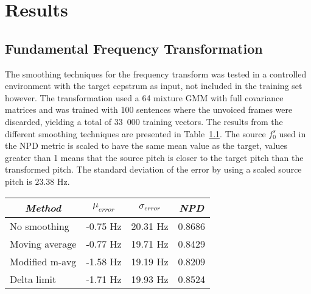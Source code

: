 \chapter{Results} %
\label{cha:results}

% 
% 
% 
% 
% 


\section{Fundamental Frequency Transformation} %
\label{sec:fundamental_frequency_ransformation}
The smoothing techniques for the frequency transform was tested in a controlled environment with the target cepstrum as input, not included in the training set however. The transformation used a 64 mixture GMM with full covariance matrices and was trained with 100 sentences where the unvoiced frames were discarded, yielding a total of 33~000 training vectors. The results from the different smoothing techniques are presented in Table~\ref{tab:pitch_pred_target_input}. The source $f_0^s$ used in the NPD metric is scaled to have the same mean value as the target, values greater than 1 means that the source pitch is closer to the target pitch than the transformed pitch. The standard deviation of the error by using a scaled source pitch is $23.38$ Hz.
\begin{table}[htbp]
	\begin{center}
		\label{tab:pitch_pred_target_input}	
		\begin{tabular}{lrrr}
			\toprule
			\multicolumn{1}{c}{\emph{Method}} & \multicolumn{1}{c}{$\mu_{error}$} & \multicolumn{1}{c}{$\sigma_{error}$} & \multicolumn{1}{c}{\emph{NPD}} \\
			\midrule
			No smoothing & -0.75 Hz & 20.31 Hz & 0.8686\\
			Moving average & -0.77 Hz & 19.71 Hz & 0.8429 \\
			Modified m-avg & -1.58 Hz & 19.19 Hz & 0.8209 \\
			Delta limit & -1.71 Hz & 19.93 Hz & 0.8524 \\
			\bottomrule			
		\end{tabular}		
	\end{center}
\end{table}

